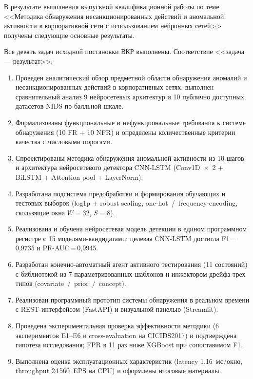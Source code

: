 
В результате выполнения выпускной квалификационной работы по теме
<<Методика обнаружения несанкционированных действий и аномальной
активности в корпоративной сети с использованием нейронных сетей>>
получены следующие основные результаты.

Все девять задач исходной постановки ВКР выполнены. Соответствие
<<задача --- результат>>:

\begin{enumerate}
    \item Проведен аналитический обзор предметной области
    обнаружения аномалий и несанкционированных действий в
    корпоративных сетях; выполнен сравнительный анализ 9 нейросетевых
    архитектур и 10 публично доступных датасетов NIDS по балльной
    шкале.

    \item Формализованы функциональные и нефункциональные требования
    к системе обнаружения (10 FR + 10 NFR) и определены
    количественные критерии качества с числовыми порогами.

    \item Спроектированы методика обнаружения аномальной активности
    из 10 шагов и архитектура нейросетевого детектора CNN-LSTM
    (Conv1D~$\times$~2 + BiLSTM + Attention pool + LayerNorm).

    \item Разработана подсистема предобработки и формирования
    обучающих и тестовых выборок (log1p + robust scaling,
    one-hot~/~frequency-encoding, скользящие окна $W = 32$, $S = 8$).

    \item Реализована и обучена нейросетевая модель детекции в едином
    программном регистре с 15 моделями-кандидатами; целевая
    CNN-LSTM достигла F1\,=\,0,9735 и PR-AUC\,=\,0,9945.

    \item Разработан конечно-автоматный агент активного тестирования
    (11 состояний) с библиотекой из 7 параметризованных шаблонов и
    инжектором дрейфа трех типов (covariate~/~prior~/~concept).

    \item Реализован программный прототип системы обнаружения в
    реальном времени с REST-интерфейсом (FastAPI) и визуальной
    панелью (Streamlit).

    \item Проведена экспериментальная проверка эффективности методики
    (6 экспериментов E1--E6 и cross-evaluation на CICIDS2017) и
    подтверждена гипотеза исследования; FPR в 11 раз ниже XGBoost при
    сопоставимом F1.

    \item Выполнена оценка эксплуатационных характеристик
    (latency 1,16~мс/окно, throughput 24\,560~EPS на CPU) и оформлены
    итоговые материалы.
\end{enumerate}

